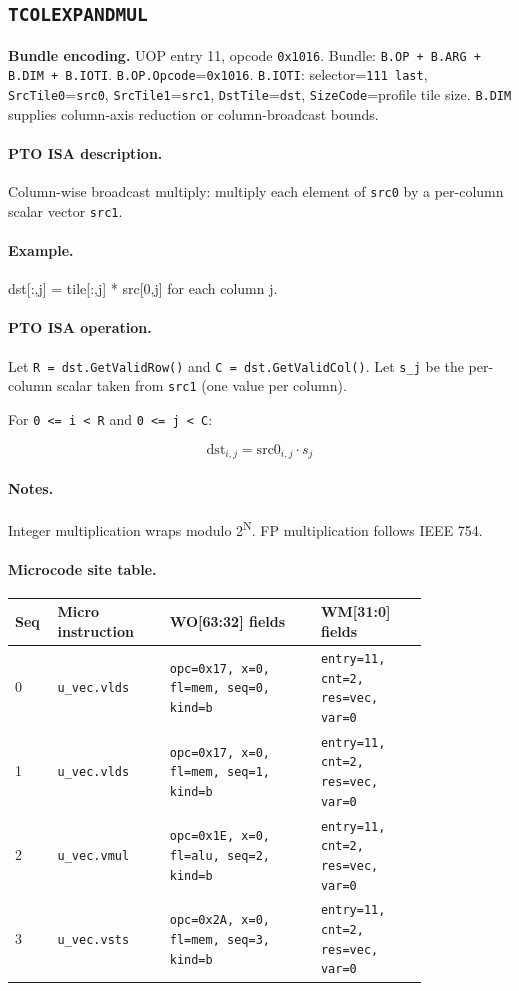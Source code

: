 \subsection{\texttt{TCOLEXPANDMUL}}
\noindent\textbf{Bundle encoding.} UOP entry 11, opcode \texttt{0x1016}. Bundle: \texttt{B.OP + B.ARG + B.DIM + B.IOTI}. \texttt{B.OP.Opcode}=\texttt{0x1016}. \texttt{B.IOTI}: selector=\texttt{111 last}, \texttt{SrcTile0}=\texttt{src0}, \texttt{SrcTile1}=\texttt{src1}, \texttt{DstTile}=\texttt{dst}, \texttt{SizeCode}=profile tile size. \texttt{B.DIM} supplies column-axis reduction or column-broadcast bounds.\par\smallskip
{\small
\paragraph{PTO ISA description.}
Column-wise broadcast multiply: multiply each element of \texttt{src0} by a per-column scalar vector \texttt{src1}.
\paragraph{Example.}
dst[:,j] = tile[:,j] * src[0,j] for each column j.
\par\smallskip
\paragraph{PTO ISA operation.}
Let \texttt{R = dst.GetValidRow()} and \texttt{C = dst.GetValidCol()}. Let \texttt{s\_j} be the per-column scalar taken from \texttt{src1} (one value per column).

For \texttt{0 \textless{}= i \textless{} R} and \texttt{0 \textless{}= j \textless{} C}:

\[
\mathrm{dst}_{i,j} = \mathrm{src0}_{i,j} \cdot s_j
\]
}\par\smallskip
\paragraph{Notes.}
Integer multiplication wraps modulo 2\textsuperscript{N}. FP multiplication follows IEEE 754.
\paragraph{Microcode site table.}
{\scriptsize
\begin{longtable}{@{}R{0.055\linewidth}L{0.23\linewidth}L{0.31\linewidth}L{0.22\linewidth}@{}}
\toprule
Seq & Micro instruction & WO[63:32] fields & WM[31:0] fields \\
 & \texttt{u\_vec.vlds} & \texttt{opc=0x17, x=0, fl=mem, seq=0, kind=b} & \texttt{entry=11, cnt=2, res=vec, var=0} \\
1 & \texttt{u\_vec.vlds} & \texttt{opc=0x17, x=0, fl=mem, seq=1, kind=b} & \texttt{entry=11, cnt=2, res=vec, var=0} \\
2 & \texttt{u\_vec.vmul} & \texttt{opc=0x1E, x=0, fl=alu, seq=2, kind=b} & \texttt{entry=11, cnt=2, res=vec, var=0} \\
3 & \texttt{u\_vec.vsts} & \texttt{opc=0x2A, x=0, fl=mem, seq=3, kind=b} & \texttt{entry=11, cnt=2, res=vec, var=0} \\
\bottomrule
\end{longtable}
}
